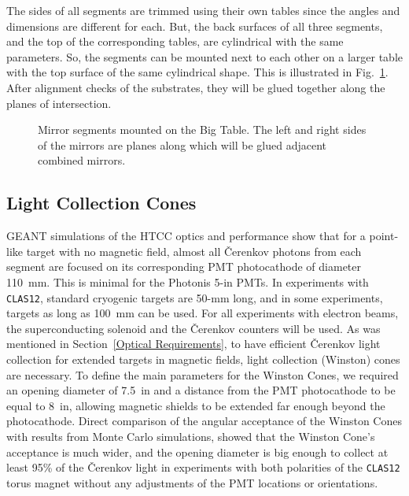 The sides of all segments are trimmed using their own tables since the 
angles and dimensions are different for each. But, the back surfaces of 
all three segments, and the top of the corresponding tables, are cylindrical 
with the same parameters. So, the segments can be mounted next to each 
other on a larger table with the top surface of the same cylindrical shape. 
This is illustrated in Fig.~\ref{segments}.  After alignment checks of 
the substrates, they will be glued together along the planes of intersection.

\begin{figure}
\begin{center}
\caption{\small{Mirror segments mounted on the Big Table.  The left and 
right sides of the mirrors are planes along which will be glued adjacent 
combined mirrors.}}
\label{segments}
\end{center}
\end{figure}

\subsection{Light Collection Cones}
\label{Light Collection}

GEANT simulations of the HTCC optics and performance show that for a
point-like target with no magnetic field, almost all {\v C}erenkov photons 
from each segment are focused on its corresponding PMT photocathode of 
diameter 110~mm. This is minimal for the Photonis 5-in PMTs.  In experiments 
with {\tt CLAS12}, standard cryogenic targets are 50-mm long, and in some 
experiments, targets as long as 100~mm can be used.  For all experiments 
with electron beams, the superconducting solenoid and the {\v C}erenkov 
counters will be used.  As was mentioned in 
Section~\ref{Optical Requirements}, to have efficient {\v C}erenkov light 
collection for extended targets in magnetic fields, light collection (Winston) 
cones are necessary.  To define the main parameters for the Winston Cones, we 
required an opening diameter of 7.5~in and a distance from the PMT 
photocathode to be equal to 8~in, allowing magnetic shields to be extended far 
enough beyond the photocathode.  Direct comparison of the angular acceptance 
of the Winston Cones with results from Monte Carlo simulations, showed that 
the Winston Cone's acceptance is much wider, and the opening diameter is big 
enough to collect at least 95\% of the {\v C}erenkov light in experiments 
with both polarities of the {\tt CLAS12} torus magnet without any 
adjustments of the PMT locations or orientations.

